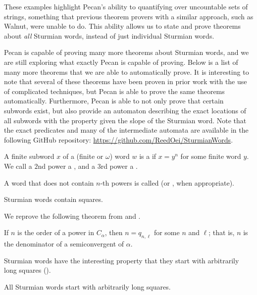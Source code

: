 \documentclass[a4paper,usenames,dvipsnames]{article}
\begin{document}
These examples highlight Pecan's ability to quantifying over uncountable sets of strings, something that previous theorem provers with a similar approach, such as Walnut, were unable to do.
This ability allows us to state and prove theorems about \emph{all} Sturmian words, instead of just individual Sturmian words.

Pecan is capable of proving many more theorems about Sturmian words, and we are still exploring what exactly Pecan is capable of proving.
Below is a list of many more theorems that we are able to automatically prove.
It is interesting to note that several of these theorems have been proven in prior work with the use of complicated techniques, but Pecan is able to prove the same theorems automatically.
Furthermore, Pecan is able to not only prove that certain subwords exist, but also provide an automaton describing the exact locations of all subwords with the property given the slope of the Sturmian word.
Note that the exact predicates and many of the intermediate automata are available in the following GitHub repository: \url{https://github.com/ReedOei/SturmianWords}.

\begin{definition}
    A finite subword $x$ of a (finite or $\omega$) word $w$ is a  if $x = y^n$ for some finite word $y$.
    We call a $2$nd power a , and a $3$rd power a .
    
    A word that does not contain $n$-th powers is called  (or ,  when appropriate).
\end{definition}

\begin{theorem}
    Sturmian words contain squares.
\end{theorem}

We reprove the following theorem from \autocite[Proposition 4.1]{PELTOMAKI2015886} and \autocite[Theorem 1]{DAMANIK2003377}.
\begin{theorem}
    If $n$ is the order of a power in $C_{\alpha}$, then $n = q_{n,\ell}$ for some $n$ and $\ell$; that is, $n$ is the denominator of a semiconvergent of $\alpha$.
\end{theorem}

Sturmian words have the interesting property that they start with arbitrarily long squares (\autocite[Theorem 1]{Dubickas2009}).

\begin{theorem}
    All Sturmian words start with arbitrarily long squares.
\end{theorem}
\end{document}
